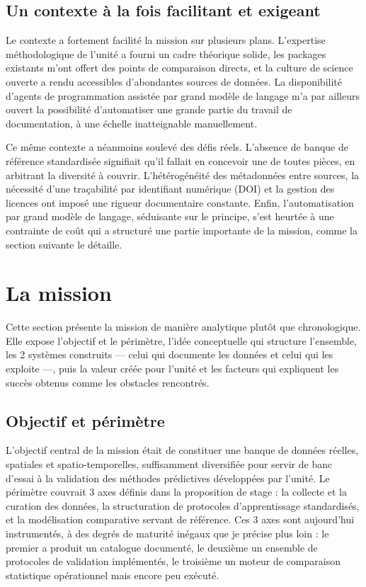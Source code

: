 \documentclass[11pt,a4paper]{article}
\begin{document}
\subsection{Un contexte à la fois facilitant et exigeant}

Le contexte a fortement facilité la mission sur plusieurs plans. L'expertise méthodologique de l'unité a fourni un cadre théorique solide, les packages existants m'ont offert des points de comparaison directs, et la culture de science ouverte a rendu accessibles d'abondantes sources de données. La disponibilité d'agents de programmation assistée par grand modèle de langage m'a par ailleurs ouvert la possibilité d'automatiser une grande partie du travail de documentation, à une échelle inatteignable manuellement.

Ce même contexte a néanmoins soulevé des défis réels. L'absence de banque de référence standardisée signifiait qu'il fallait en concevoir une de toutes pièces, en arbitrant la diversité à couvrir. L'hétérogénéité des métadonnées entre sources, la nécessité d'une traçabilité par identifiant numérique (DOI) et la gestion des licences ont imposé une rigueur documentaire constante. Enfin, l'automatisation par grand modèle de langage, séduisante sur le principe, s'est heurtée à une contrainte de coût qui a structuré une partie importante de la mission, comme la section suivante le détaille.

\section{La mission}

Cette section présente la mission de manière analytique plutôt que chronologique. Elle expose l'objectif et le périmètre, l'idée conceptuelle qui structure l'ensemble, les 2 systèmes construits --- celui qui documente les données et celui qui les exploite ---, puis la valeur créée pour l'unité et les facteurs qui expliquent les succès obtenus comme les obstacles rencontrés.

\subsection{Objectif et périmètre}

L'objectif central de la mission était de constituer une banque de données réelles, spatiales et spatio-temporelles, suffisamment diversifiée pour servir de banc d'essai à la validation des méthodes prédictives développées par l'unité. Le périmètre couvrait 3 axes définis dans la proposition de stage : la collecte et la curation des données, la structuration de protocoles d'apprentissage standardisés, et la modélisation comparative servant de référence. Ces 3 axes sont aujourd'hui instrumentés, à des degrés de maturité inégaux que je précise plus loin : le premier a produit un catalogue documenté, le deuxième un ensemble de protocoles de validation implémentés, le troisième un moteur de comparaison statistique opérationnel mais encore peu exécuté.
\end{document}

